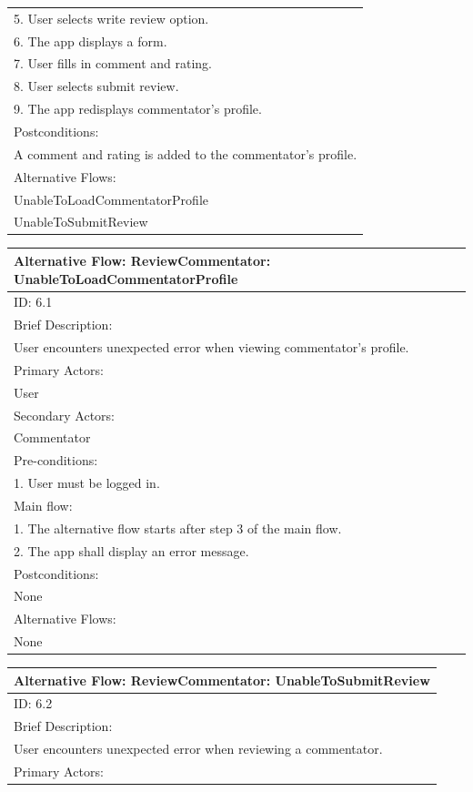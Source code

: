 \documentclass{article}
\begin{document}
\begin{flushleft}
\begin{longtable}[l]{|l|}
5. User selects write review option.\\
6. The app displays a form.\\
7. User fills in comment and rating.\\
8. User selects submit review.\\
9. The app redisplays commentator’s profile.\\
\hline
Postconditions:\\
A comment and rating is added to the commentator’s profile.\\
\hline
Alternative Flows:\\
UnableToLoadCommentatorProfile\\
UnableToSubmitReview\\
\hline
\end{longtable}
\begin{longtable}[l]{|l|}
\hline
Alternative Flow: ReviewCommentator: UnableToLoadCommentatorProfile\\
\hline
ID: 6.1\\
\hline
Brief Description: \\
User encounters unexpected error when viewing commentator’s profile.\\
\hline
Primary Actors:\\
User\\
\hline
Secondary Actors:\\
Commentator\\
\hline
Pre-conditions:\\
1. User must be logged in.\\
\hline
Main flow:\\
1. The alternative flow starts after step 3 of the main flow.\\
2. The app shall display an error message.\\
\hline
Postconditions:\\
None\\
\hline
Alternative Flows:\\
None\\
\hline
\end{longtable}
\begin{longtable}[l]{|l|}
\hline
Alternative Flow: ReviewCommentator: UnableToSubmitReview\\
\hline
ID: 6.2\\
\hline
Brief Description: \\
User encounters unexpected error when reviewing a commentator.\\
\hline
Primary Actors:\\

\end{longtable}
\end{flushleft}
\end{document}
